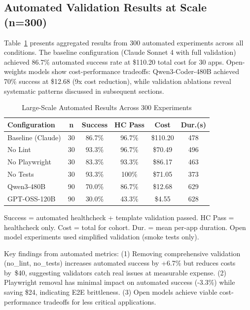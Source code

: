 \documentclass[conference]{IEEEtran}
\begin{document}
\subsection{Automated Validation Results at Scale (n=300)}

Table~\ref{tab:large-scale-automated} presents aggregated results from 300 automated experiments across all conditions. The baseline configuration (Claude Sonnet 4 with full validation) achieved 86.7\% automated success rate at \$110.20 total cost for 30 apps. Open-weights models show cost-performance tradeoffs: Qwen3-Coder-480B achieved 70\% success at \$12.68 (9x cost reduction), while validation ablations reveal systematic patterns discussed in subsequent sections.

\begin{table}[!t]
\caption{Large-Scale Automated Results Across 300 Experiments}
\label{tab:large-scale-automated}
\centering
\small
\begin{threeparttable}
\begin{tabular}{@{}lccccc@{}}
\toprule
\textbf{Configuration} & \textbf{n} & \textbf{Success} & \textbf{HC Pass} & \textbf{Cost} & \textbf{Dur.(s)} \\
\midrule
Baseline (Claude) & 30 & 86.7\% & 96.7\% & \$110.20 & 478 \\
No Lint & 30 & 93.3\% & 96.7\% & \$70.49 & 496 \\
No Playwright & 30 & 83.3\% & 93.3\% & \$86.17 & 463 \\
No Tests & 30 & 93.3\% & 100\% & \$71.05 & 373 \\
\midrule
Qwen3-480B & 90 & 70.0\% & 86.7\% & \$12.68 & 629 \\
GPT-OSS-120B & 90 & 30.0\% & 43.3\% & \$4.55 & 628 \\
\bottomrule
\end{tabular}
\begin{tablenotes}\footnotesize
\item Success = automated healthcheck + template validation passed. HC Pass = healthcheck only. Cost = total for cohort. Dur. = mean per-app duration. Open model experiments used simplified validation (smoke tests only).
\end{tablenotes}
\end{threeparttable}
\end{table}

Key findings from automated metrics: (1) Removing comprehensive validation (no\_lint, no\_tests) increases automated success by +6.7\% but reduces costs by~\$40, suggesting validators catch real issues at measurable expense. (2) Playwright removal has minimal impact on automated success (-3.3\%) while saving \$24, indicating E2E brittleness. (3) Open models achieve viable cost-performance tradeoffs for less critical applications.
\end{document}
